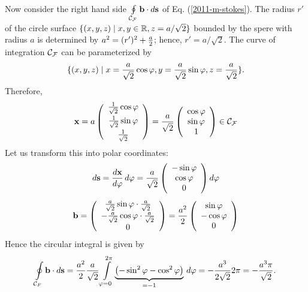 {\begin{enumerate}
Now consider the right hand side $\oint \limits_{{\cal C}_{\cal F}} {\bf b} \cdot d{\bf s}$
of Eq. (\ref{2011-m-stokes}).
The radius $r'$ of the circle  surface
$\{(x,y,z) \mid x,y \in {\Bbb R} ,z=a/\sqrt{2}\}$ bounded by the spere with radius $a$
is determined by
$ a^2 =(r')^2 +{a\over 2}$; hence, $r' =a/\sqrt{2}$.
The curve of integration ${\cal C}_{\cal F}$ can be parameterized by
$$\{(x,y,z) \mid
x={a\over \sqrt{2}} \cos \varphi,
y={a\over \sqrt{2}} \sin \varphi,
z={a\over \sqrt{2}}\}.$$
Therefore,
$$
  {\bf x} = a
  \left(
    \begin{array}{c}
      \frac{1}{\sqrt2}\cos\varphi \\[1ex]
      \frac{1}{\sqrt2}\sin\varphi \\[1ex]
      \frac{1}{\sqrt2}
    \end{array}
  \right)=
  \frac{a}{\sqrt{2}}
  \left(
    \begin{array}{c}
      \cos\varphi \\
      \sin\varphi \\
      1
    \end{array}
  \right)
\in {\cal C}_{\cal F}
$$
Let us transform this into polar coordinates:
$$
  d{\bf s}=\frac{d{\bf x}}{d\varphi} \,d\varphi =
  \frac{a}{\sqrt{2}}
  \left(
    \begin{array}{c}
      -\sin\varphi \\
      \cos\varphi \\
      0
    \end{array}
  \right) d\varphi
$$
$$
  {\bf b}=
  \left(
    \begin{array}{c}
      \frac{a}{\sqrt{2}}\sin\varphi\cdot\frac{a}{\sqrt{2}} \\
      -\frac{a}{\sqrt{2}}\cos\varphi\cdot\frac{a}{\sqrt{2}} \\
      0
    \end{array}
  \right)=
  \frac{a^2}{2}
  \left(
    \begin{array}{c}
      \sin\varphi \\
      -\cos\varphi \\
      0
    \end{array}
  \right)
$$
Hence the circular integral is given by
$$
  \oint \limits_{{\cal C}_F} {\bf b} \cdot d{\bf s}=
  \frac{a^2}{2}\frac{a}{\sqrt{2}}
  \int \limits_{\varphi=0}^{2 \pi}
  \underbrace
    {\left(-\sin^2\varphi-\cos^2\varphi\right)}
  _{=-1}
  \, d\varphi =
  -\frac{a^3}{2\sqrt{2}}2 \pi=-\frac{a^3 \pi}{\sqrt{2}}
.
$$




\end{enumerate}

\eexample
}


\begin{center}
{\color{olive}   \Huge
\floweroneright
}
\end{center}


